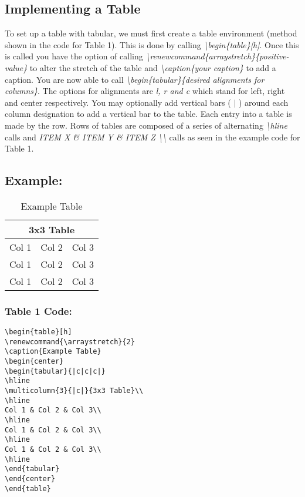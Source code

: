 \documentclass[12pt,journal,compsoc]{IEEEtran}
\begin{document}
\subsection{Implementing a Table}
To set up a table with tabular, we must first create a table environment  (method shown in the code for Table 1).  This is done by calling \emph{\textbackslash begin\{table\}[h]}. Once this is called you have the option of calling \emph{\textbackslash renewcommand\{arraystretch\}\{positive-value\}} to alter the stretch of the table and \emph{\textbackslash caption\{your caption\}} to add a caption. You are now able to call \emph{\textbackslash begin\{tabular\}\{desired alignments for columns\}}. The options for alignments are \emph{l, r \emph{and} c} which stand for left, right and center respectively. You may optionally add vertical bars ( $|$ ) around each column designation to add a vertical bar to the table. Each entry into a table is made by the row. Rows of tables are composed of a series of alternating \emph{\textbackslash hline} calls and  \emph{ITEM X \& ITEM Y \& ITEM Z \textbackslash \textbackslash} calls as seen in the example code for Table 1.
\subsection*{Example:}
\begin{table}[h]
\renewcommand{\arraystretch}{2}
\caption{Example Table}
\begin{center}
\begin{tabular}{|c|c|c|}
\hline
\multicolumn{3}{|c|}{3x3 Table}\\
\hline
Col 1 & Col 2 & Col 3\\
\hline
Col 1 & Col 2 & Col 3\\
\hline
Col 1 & Col 2 & Col 3\\
\hline
\end{tabular}
\end{center}
\end{table}

\subsubsection*{Table 1 Code:}
{\small
\begin{center}
\begin{verbatim}
\begin{table}[h]
\renewcommand{\arraystretch}{2}
\caption{Example Table}
\begin{center}
\begin{tabular}{|c|c|c|}
\hline
\multicolumn{3}{|c|}{3x3 Table}\\
\hline
Col 1 & Col 2 & Col 3\\
\hline
Col 1 & Col 2 & Col 3\\
\hline
Col 1 & Col 2 & Col 3\\
\hline
\end{tabular}
\end{center}
\end{table}
\end{verbatim}
\end{center}}
\end{document}
